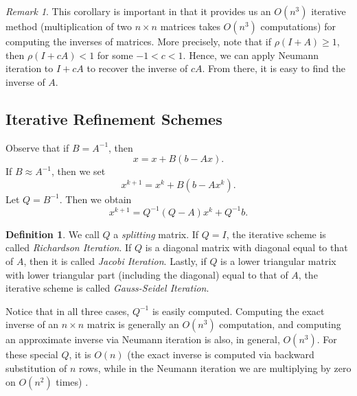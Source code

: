 \documentclass[12pt]{article}
\theoremstyle{plain}
\theoremstyle{definition}
\newtheorem*{definition}{Definition}
\theoremstyle{remark}
\newtheorem*{remark}{Remark}
\numberwithin{equation}{section}  %
\begin{document}
\begin{remark}
	This corollary is important in that it provides us  an $O(n^3)$ iterative method
	(multiplication of two $n \times n$ matrices takes $O(n^3)$ computations) for
	computing the inverses of matrices. More precisely, note that if $\rho(I + A)
	\ge 1$, then $\rho(I + cA) < 1$ for some $-1 < c < 1$. Hence, we can apply
	Neumann iteration to $I + cA$ to recover the inverse of $cA$. From there, it is
	easy to find the inverse of $A$.
\end{remark}

\subsection{Iterative Refinement Schemes}
Observe that if $B = A^{-1}$, then
\begin{equation*}
	x = x + B(b - Ax).
\end{equation*}
If $B \approx A^{-1}$, then we set
\begin{equation*}
	x^{k+1} = x^{k} + B(b - Ax^{k}).
\end{equation*}
Let $Q = B^{-1}$. Then we obtain
\begin{equation*}
	x^{k+1} = Q^{-1}(Q - A)x^{k} + Q^{-1}b.
\end{equation*}
\begin{definition}
	We call $Q$ a \emph{splitting} matrix. If $Q = I$, the iterative scheme is
	called \emph{Richardson Iteration}. If $Q$ is a diagonal matrix with diagonal
	equal to that of $A$, then it is called \emph{Jacobi Iteration}. Lastly, if $Q$
	is a lower triangular matrix with lower triangular part (including the diagonal)
	equal to that of $A$, the iterative scheme is called \emph{Gauss-Seidel
	Iteration}.
\end{definition}
Notice that in all three cases, $Q^{-1}$ is easily computed. Computing the exact inverse
of an $n \times n$ matrix is generally an $O(n^3)$ computation, and computing
an approximate inverse via Neumann iteration is also, in general, $O(n^3)$. For these special $Q$, 
it is $O(n)$ (the exact inverse is computed via backward substitution of $n$ rows, while in the
Neumann iteration we are multiplying by zero on $O(n^2)$ times) .
\end{document}
